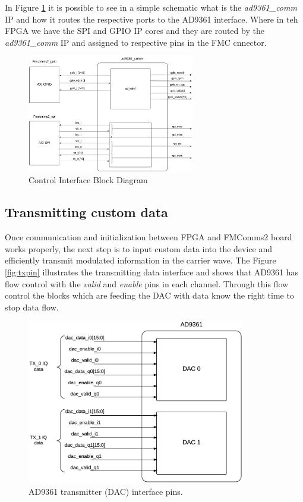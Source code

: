 In Figure \ref{fig:commif} it is possible to see in a simple schematic what is
the \emph{ad9361\_comm} IP and how it routes the respective ports to the AD9361
interface. Where in teh FPGA we have the SPI and GPIO IP cores and they are
routed by the \emph{ad9361\_comm} IP and assigned to respective pins in the FMC
cnnector.

\begin{figure}[htbp]
    \centering
    \includegraphics[width=0.65\textwidth]{./figures/comm_if}
    \caption{ Control Interface Block Diagram
    \label{fig:commif}}
\end{figure}

\subsection{Transmitting custom data}

Once communication and initialization between FPGA and FMComms2 board works
properly, the next step is to input custom data into the device and efficiently
transmit modulated information in the carrier wave. The Figure \ref{fig:txpin}
illustrates the transmitting data interface and shows that AD9361 has flow
control with the \emph{valid} and \emph{enable} pins in each channel. Through
this flow control the blocks which are feeding the DAC with data know the right
time to stop data flow.

\begin{figure}[htbp]
    \centering
    \includegraphics[width=0.85\textwidth]{./figures/ad9361tx_pins}
    \caption{ AD9361 transmitter (DAC) interface pins.
    \label{fig:txpins}}
\end{figure}

